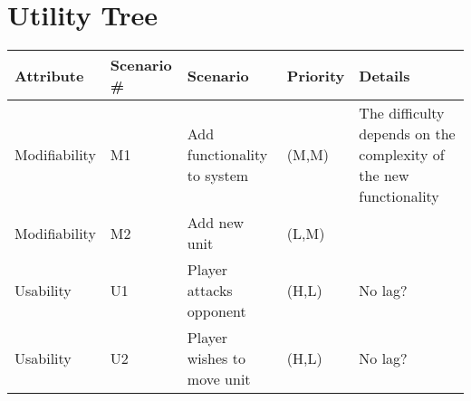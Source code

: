 \section{Utility Tree}


\begin{tabular}{|l|l|l|l|l|}
  \hline
  {\bf Attribute} & {\bf Scenario \#} & {\bf Scenario} & {\bf Priority} &
    {\bf Details} \\ \hline
  Modifiability & M1 & Add functionality to system & (M,M) & The difficulty depends on the complexity of the new functionality \\ \hline
  Modifiability & M2 & Add new unit & (L,M) & \\ \hline
  Usability & U1 & Player attacks opponent & (H,L) & No lag?\\ \hline
  Usability & U2 & Player wishes to move unit & (H,L) & No lag?\\ \hline
\end{tabular}
